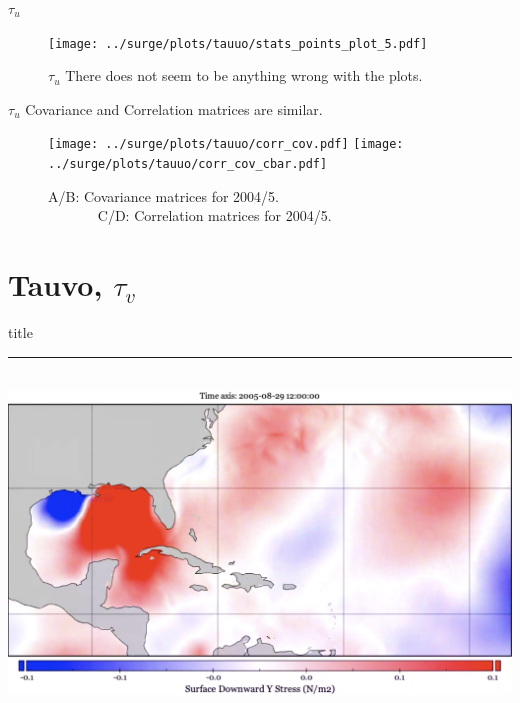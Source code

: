 \begin{frame}{$\tau_u$ }
\vspace{-20pt}
\begin{figure}[htb!]
    \centering
    \texttt{[image: ../surge/plots/tauuo/stats\_points\_plot\_5.pdf]}
    \vspace{-7pt}
    \caption{$\tau_u$ There does not seem to be anything wrong with the plots.}
    \label{fig:A}
\end{figure}
\end{frame}


\begin{frame}{$\tau_u$  Covariance and Correlation matrices are similar.  }
\vspace{-20pt}
\begin{figure}[htb!]
    \centering
    \hspace{-10pt}
    \texttt{[image: ../surge/plots/tauuo/corr\_cov.pdf]}
     \texttt{[image: ../surge/plots/tauuo/corr\_cov\_cbar.pdf]}
    \vspace{-7pt}
    \caption{A/B: Covariance matrices for 2004/5.\\
    $\quad\quad\quad\;\;$C/D: Correlation matrices for 2004/5.}
    \label{fig:}
\end{figure}
\end{frame}

\section{Tauvo, $\tau_v$ }
    \begin{frame}[plain]
        \vfill
      \centering
      \begin{beamercolorbox}[sep=8pt,center,shadow=true,rounded=true]{title}
        \insertsectionhead\par%
        \color{oxfordblue}\noindent\rule{10cm}{1pt} \\
                \includegraphics[width=0.93\linewidth]{images/example-images/tauvo.png}
      \end{beamercolorbox}
      \vfill
  \end{frame}

